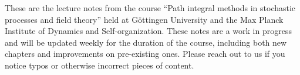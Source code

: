 These are the lecture notes from the course ``Path integral methods in stochastic processes and field theory'' held at Göttingen University and the Max Planck Institute of Dynamics and Self-organization. These notes are a work in progress and will be updated weekly for the duration of the course, including both new chapters and improvements on pre-existing ones. Please reach out to us if you notice typos or otherwise incorrect pieces of content. 
